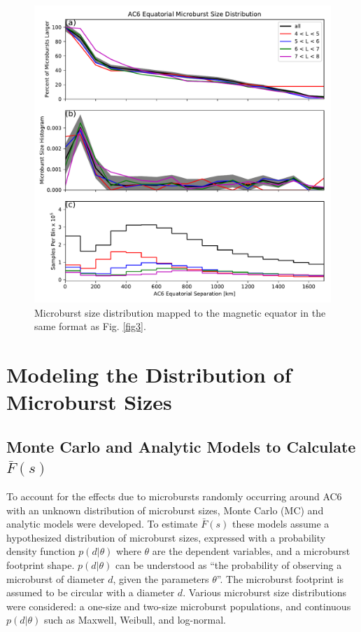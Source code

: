 \documentclass[draft]{agujournal2019}
\begin{document}
\begin{figure}
\includegraphics[width=\textwidth]{fig4.pdf}
\caption{Microburst size distribution mapped to the magnetic equator in the same format as Fig. \ref{fig3}.} 
\label{fig4}
\end{figure}

\section{Modeling the Distribution of Microburst Sizes} \label{model_section}
\subsection{Monte Carlo and Analytic Models to Calculate $\bar{F}(s)$}

To account for the effects due to microbursts randomly occurring around AC6 with an unknown distribution of microburst sizes, Monte Carlo (MC) and analytic models were developed. To estimate $\bar{F}(s)$ these models assume a hypothesized distribution of microburst sizes, expressed with a probability density function $p(d | \theta)$ where $\theta$ are the dependent variables, and a microburst footprint shape. $p(d | \theta)$ can be understood as ``the probability of observing a microburst of diameter $d$, given the parameters $\theta$''. The microburst footprint is assumed to be circular with a diameter $d$. Various microburst size distributions were considered: a one-size and two-size microburst populations, and continuous $p(d | \theta)$ such as Maxwell, Weibull, and log-normal.
\end{document}

